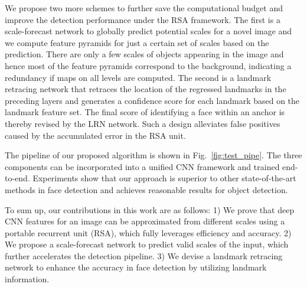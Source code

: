 \documentclass[10pt,twocolumn,letterpaper]{article}
\begin{document}
We propose two more schemes to further save the computational budget and improve the detection performance under the RSA framework.
%
%
The first is a scale-forecast network %
to globally predict  potential scales for a novel image and we compute feature pyramids for just a certain set of scales based on the prediction. There are only a few scales of objects appearing in the image and hence
most of the feature pyramids correspond to the background, indicating a redundancy if maps on all levels 
are computed.
The second is a landmark retracing network %
that retraces the location 
of the regressed landmarks in the preceding layers and generates a confidence score for each landmark based on the landmark feature set. The final score of identifying a face within an anchor is thereby revised by the LRN network. Such a design alleviates false positives 
caused by the accumulated error in the RSA unit. 

The pipeline of our proposed algorithm 
is shown in %
Fig.~\ref{fig:test_pipe}.
The three components %
can be incorporated into a unified CNN framework and trained end-to-end.
%
Experiments show that our approach is superior to other state-of-the-art methods in face detection and achieves reasonable results for object detection. 
%

To sum up, our contributions in this work are as follows: 1) We prove that deep CNN features for an image can be approximated from different scales using a portable recurrent unit (RSA), which fully leverages efficiency and accuracy. 2) We propose a scale-forecast network to predict valid scales of the input, which further accelerates the detection pipeline. 3) We devise a landmark retracing network to enhance the accuracy in face detection by utilizing landmark information.
\end{document}
